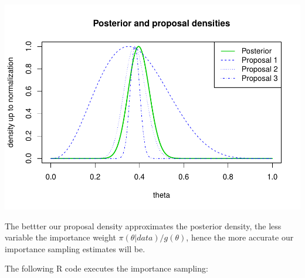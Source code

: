 \documentclass[]{article}
\begin{document}
\includegraphics{Stats406Lab11_files/figure-latex/unnamed-chunk-3-2.pdf}

The bettter our proposal density approximates the posterior density, the
less variable the importance weight \(\pi(\theta|data)/g(\theta)\),
hence the more accurate our importance sampling estimates will be.

The following R code executes the importance sampling:
\end{document}

